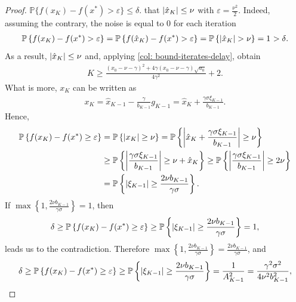 \documentclass{article}
\begin{document}
\begin{proof}
     $\mathbb{P}\{f(x_K) - f(x^*) > \varepsilon\} \leq \delta$.  that $\left\lvert\hat{x}_K\right\rvert \leq \nu$ with $\varepsilon = \frac{\nu^2}{2}$. Indeed, assuming the contrary, the noise is equal to $0$ for each iteration 
    \begin{align*}
        \mathbb{P}\left\{f(x_K) - f(x^*) > \varepsilon \right\} = \mathbb{P}\left\{f(\hat x_K) - f(x^*) > \varepsilon \right\} = \mathbb{P}\left\{\left\lvert\hat{x}_K\right\rvert > \nu \right\} = 1~{\color{black}> \delta}.
    \end{align*}
    As a result, $\left\lvert\hat{x}_K\right\rvert \leq \nu$ and, applying \cref{col: bound-iterates-delay},  obtain
    \begin{align*}
        K \geq \frac{(x_0 - \nu - \gamma)^2 + 4\gamma(x_0 - \nu - \gamma)\sqrt{a_0}}{4\gamma^2} + 2.
    \end{align*}
    What is more, $x_K$ can be written as
    \begin{align*}
        x_K = \hat{x}_{K-1} - \frac{\gamma}{b_{K-1}}g_{K-1} = \hat{x}_K + \frac{\gamma \sigma \xi_{K-1}}{b_{K-1}}.
    \end{align*}
    Hence, 
    \begin{align*}
        \mathbb{P}\left\{f(x_K) - f(x^*) \geq \varepsilon \right\} &=  \mathbb{P}\left\{\left\lvert x_K\right\rvert \geq \nu \right\} = \mathbb{P}\left\{\left\lvert\hat{x}_K + \frac{\gamma \sigma \xi_{K-1}}{b_{K-1}}\right\rvert \geq \nu \right\} \\&\geq \mathbb{P}\left\{\left\lvert\frac{\gamma \sigma \xi_{K-1}}{b_{K-1}}\right\rvert \geq \nu + \hat{x}_K\right\} \geq \mathbb{P}\left\{\left\lvert\frac{\gamma \sigma \xi_{K-1}}{b_{K-1}}\right\rvert \geq 2\nu\right\} \\&= \mathbb{P}\left\{\left\lvert\xi_{K-1}\right\rvert \geq \frac{2\nu b_{K-1}}{\gamma \sigma}\right\}.
    \end{align*}
    If $\max\left\{1, \frac{2\nu b_{K-1}}{\gamma \sigma}\right\} = 1$, then
    \begin{align*}
        \delta \geq  \mathbb{P}\left\{f(x_K) - f(x^*) \geq \varepsilon \right\} \geq \mathbb{P}\left\{\left\lvert\xi_{K-1}\right\rvert \geq \frac{2\nu b_{K-1}}{\gamma \sigma}\right\} = 1,
    \end{align*}
     leads us to the contradiction. Therefore $\max\left\{1, \frac{2\nu b_{K-1}}{\gamma \sigma}\right\} = \frac{2\nu b_{K-1}}{\gamma \sigma}$, and
    \begin{align*}
        \delta \geq  \mathbb{P}\left\{f(x_K) - f(x^*) \geq \varepsilon \right\} \geq \mathbb{P}\left\{\abs{\xi_{K-1}} \geq \frac{2\nu b_{K-1}}{\gamma \sigma}\right\} = \frac{1}{A_{K-1}^2} = \frac{\gamma^2 \sigma^2}{4\nu^2 b_{K-1}^2},

\end{align*}
\end{proof}
\end{document}
